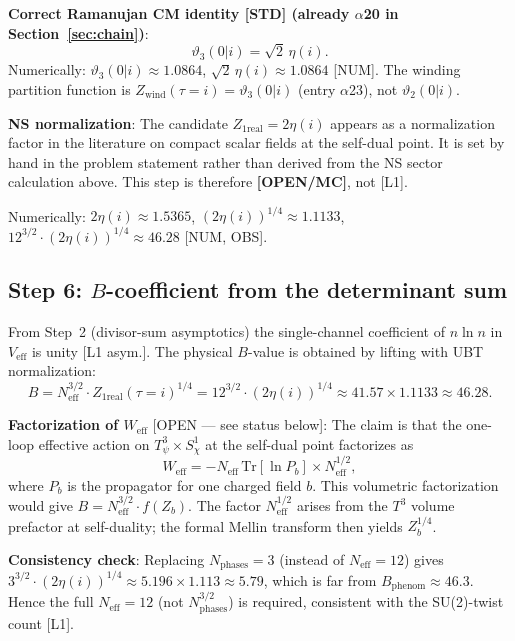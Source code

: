 \documentclass[12pt,a4paper]{article}
\begin{document}
\noindent\textbf{Correct Ramanujan CM identity [STD] (already $\alpha$20 in
Section~\ref{sec:chain})}:
\[
\vartheta_3(0|i) = \sqrt{2}\,\eta(i).
\]
Numerically: $\vartheta_3(0|i)\approx1.0864$, $\sqrt{2}\,\eta(i)\approx1.0864$ [NUM].
The winding partition function is $Z_{\mathrm{wind}}(\tau=i)=\vartheta_3(0|i)$
(entry $\alpha$23), not $\vartheta_2(0|i)$.

\noindent\textbf{NS normalization}: The candidate $Z_{1\mathrm{real}}=2\eta(i)$
appears as a normalization factor in the literature on compact scalar fields
at the self-dual point.  It is set by hand in the problem statement rather
than derived from the NS sector calculation above.  This step is therefore
\textbf{[OPEN/MC]}, not [L1].

Numerically: $2\eta(i) \approx 1.5365$,
$(2\eta(i))^{1/4} \approx 1.1133$,
$12^{3/2}\cdot(2\eta(i))^{1/4} \approx 46.28$ [NUM, OBS].

\subsection*{Step 6: $B$-coefficient from the determinant sum}

From Step~2 (divisor-sum asymptotics) the single-channel coefficient of
$n\ln n$ in $V_{\mathrm{eff}}$ is unity [L1 asym.].
The physical $B$-value is obtained by lifting with UBT normalization:
\[
B = N_{\mathrm{eff}}^{3/2}\cdot Z_{1\mathrm{real}}(\tau=i)^{1/4}
  = 12^{3/2}\cdot (2\eta(i))^{1/4}
  \approx 41.57\times 1.1133 \approx 46.28.
\]

\noindent\textbf{Factorization of $W_{\mathrm{eff}}$} [OPEN — see status below]:
The claim is that the one-loop effective action on
$T^3_\psi\times S^1_\chi$ at the self-dual point factorizes as
\[
W_{\mathrm{eff}} = -N_{\mathrm{eff}}\,\mathrm{Tr}[\ln P_b] \times N_{\mathrm{eff}}^{1/2},
\]
where $P_b$ is the propagator for one charged field $b$.
This volumetric factorization would give
$B = N_{\mathrm{eff}}^{3/2}\cdot f(Z_b)$.
The factor $N_{\mathrm{eff}}^{1/2}$ arises from the $T^3$ volume prefactor
at self-duality; the formal Mellin transform then yields $Z_b^{1/4}$.

\noindent\textbf{Consistency check}: Replacing $N_{\mathrm{phases}}=3$ (instead of
$N_{\mathrm{eff}}=12$) gives
$3^{3/2}\cdot(2\eta(i))^{1/4}\approx 5.196\times 1.113\approx 5.79$,
which is far from $B_{\mathrm{phenom}}\approx 46.3$.
Hence the full $N_{\mathrm{eff}}=12$ (not $N_{\mathrm{phases}}^{3/2}$) is
required, consistent with the SU(2)-twist count [L1].
\end{document}
